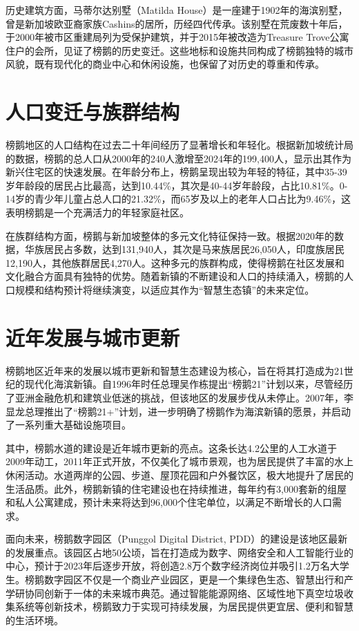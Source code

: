 \documentclass[11pt,a4paper,twoside,openany]{book}
\begin{document}
历史建筑方面，马蒂尔达别墅（Matilda House）是一座建于1902年的海滨别墅，曾是新加坡欧亚裔家族Cashins的居所，历经四代传承。该别墅在荒废数十年后，于2000年被市区重建局列为受保护建筑，并于2015年被改造为Treasure Trove公寓住户的会所，见证了榜鹅的历史变迁。这些地标和设施共同构成了榜鹅独特的城市风貌，既有现代化的商业中心和休闲设施，也保留了对历史的尊重和传承。

\section{人口变迁与族群结构}
榜鹅地区的人口结构在过去二十年间经历了显著增长和年轻化。根据新加坡统计局的数据，榜鹅的总人口从2000年的240人激增至2024年的199,400人，显示出其作为新兴住宅区的快速发展。在年龄分布上，榜鹅呈现出较为年轻的特征，其中35-39岁年龄段的居民占比最高，达到10.44\%，其次是40-44岁年龄段，占比10.81\%。0-14岁的青少年儿童占总人口的21.32\%，而65岁及以上的老年人口占比为9.46\%，这表明榜鹅是一个充满活力的年轻家庭社区。

在族群结构方面，榜鹅与新加坡整体的多元文化特征保持一致。根据2020年的数据，华族居民占多数，达到131,940人，其次是马来族居民26,050人，印度族居民12,190人，其他族群居民4,270人。这种多元的族群构成，使得榜鹅在社区发展和文化融合方面具有独特的优势。随着新镇的不断建设和人口的持续涌入，榜鹅的人口规模和结构预计将继续演变，以适应其作为“智慧生态镇”的未来定位。

\section{近年发展与城市更新}
榜鹅地区近年来的发展以城市更新和智慧生态建设为核心，旨在将其打造成为21世纪的现代化海滨新镇。自1996年时任总理吴作栋提出“榜鹅21”计划以来，尽管经历了亚洲金融危机和建筑业低迷的挑战，但该地区的发展步伐从未停止。2007年，李显龙总理推出了“榜鹅21+”计划，进一步明确了榜鹅作为海滨新镇的愿景，并启动了一系列重大基础设施项目。

其中，榜鹅水道的建设是近年城市更新的亮点。这条长达4.2公里的人工水道于2009年动工，2011年正式开放，不仅美化了城市景观，也为居民提供了丰富的水上休闲活动。水道两岸的公园、步道、屋顶花园和户外餐饮区，极大地提升了居民的生活品质。此外，榜鹅新镇的住宅建设也在持续推进，每年约有3,000套新的组屋和私人公寓建成，预计未来将达到96,000个住宅单位，以满足不断增长的人口需求。

面向未来，榜鹅数字园区（Punggol Digital District, PDD）的建设是该地区最新的发展重点。该园区占地50公顷，旨在打造成为数字、网络安全和人工智能行业的中心，预计于2023年后逐步开放，将创造2.8万个数字经济岗位并吸引1.2万名大学生。榜鹅数字园区不仅是一个商业产业园区，更是一个集绿色生态、智慧出行和产学研协同创新于一体的未来城市典范。通过智能能源网络、区域性地下真空垃圾收集系统等创新技术，榜鹅致力于实现可持续发展，为居民提供更宜居、便利和智慧的生活环境。
\end{document}
